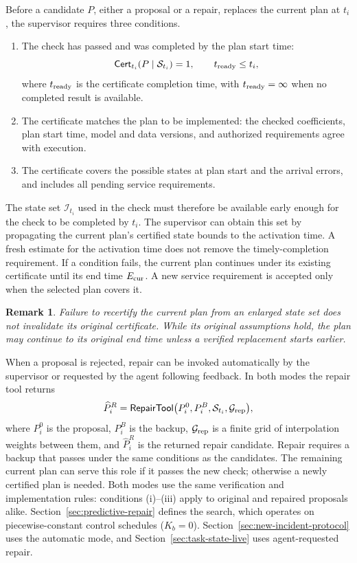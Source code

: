 \documentclass[final]{cas-sc}
\theoremstyle{definition}
\theoremstyle{plain}
\newtheorem{remark}{Remark}
\theoremstyle{definition}
\theoremstyle{plain}
\begin{document}
Before a candidate $P$, either a proposal or a repair, replaces the
current plan at $t_i$, the supervisor requires three conditions.
\begin{enumerate}
\renewcommand{\labelenumi}{(\roman{enumi})}
\item The check has passed and was completed by the plan start time:
\[
\mathsf{Cert}_{t_i}(P\mid\mathcal S_{t_i})=1,\qquad
t_{\rm ready}\le t_i,
\]
where $t_{\rm ready}$ is the certificate completion time, with
$t_{\rm ready}=\infty$ when no completed result is available.
\item The certificate matches the plan to be implemented: the checked
coefficients, plan start time, model and data versions, and
authorized requirements agree with execution.
\item The certificate covers the possible states at plan start and
the arrival errors, and includes all pending service requirements.
\end{enumerate}
The state set $\mathcal I_{t_i}$ used in the check must therefore be
available early enough for the check to be completed by $t_i$. The
supervisor can obtain this set by propagating the current plan's
certified state bounds to the activation time. A fresh estimate for
the activation time does not remove the timely-completion requirement. If a condition fails, the current plan
continues under its existing certificate until its end time
$E_{\rm cur}$. A new service requirement is accepted only when the
selected plan covers it.

\begin{remark}
\label{rem:recertification}
Failure to recertify the current plan from an enlarged state set does
not invalidate its original certificate. While its original
assumptions hold, the plan may continue to its original end time
unless a verified replacement starts earlier.
\end{remark}

When a proposal is rejected, repair can be invoked automatically by
the supervisor or requested by the agent following feedback. In both
modes the repair tool returns
\begin{equation}
\widehat P_i^{R}=\mathsf{RepairTool}\big(P_i^{0},P_i^{B},
\mathcal S_{t_i},\mathcal G_{\rm rep}\big),
\label{eq:repair-tool-interface}
\end{equation}
where $P_i^{0}$ is the proposal, $P_i^{B}$ is the backup,
$\mathcal G_{\rm rep}$ is a finite grid of interpolation weights
between them, and $\widehat P_i^{R}$ is the returned repair candidate.
Repair requires a backup that passes under the same conditions as the
candidates. The remaining current plan can serve this role if it
passes the new check; otherwise a newly certified plan is needed. Both
modes use the same verification and implementation rules:
conditions (i)--(iii) apply to original and repaired proposals alike.
Section~\ref{sec:predictive-repair} defines the search, which operates on
piecewise-constant control schedules ($K_b=0$).
Section~\ref{sec:new-incident-protocol} uses the automatic mode, and
Section~\ref{sec:task-state-live} uses agent-requested repair.
\end{document}
